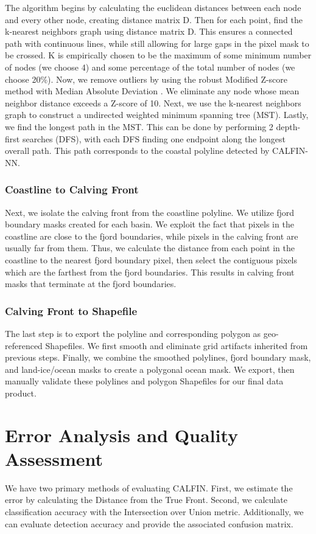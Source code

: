 \documentclass[tc, manuscript]{copernicus}
\begin{document}
The algorithm begins by calculating the euclidean distances between each node and every other node, creating distance matrix D. 
Then for each point, find the k-nearest neighbors graph using distance matrix D. This ensures a connected path with continuous lines, while still allowing for large gaps in the pixel mask to be crossed. K is empirically chosen to be the maximum of some minimum number of nodes (we choose 4) and some percentage of the total number of nodes (we choose 20\%). 
Now, we remove outliers by using the robust Modified Z-score method with Median Absolute Deviation \citep{garcia2012}. We eliminate any node whose mean neighbor distance exceeds a Z-score of 10. 
Next, we use the k-nearest neighbors graph to construct a undirected weighted minimum spanning tree (MST). Lastly, we find the longest path in the MST. This can be done by performing 2 depth-first searches (DFS), with each DFS finding one endpoint along the longest overall path. This path corresponds to the coastal polyline detected by CALFIN-NN.

\subsubsection{Coastline to Calving Front}
\label{sec:coastline}
Next, we isolate the calving front from the coastline polyline. We utilize fjord boundary masks created for each basin. We exploit the fact that pixels in the coastline are close to the fjord boundaries, while pixels in the calving front are usually far from them.
Thus, we calculate the distance from each point in the coastline to the nearest fjord boundary pixel, then select the contiguous pixels which are the farthest from the fjord boundaries. This results in calving front masks that terminate at the fjord boundaries.

\subsubsection{Calving Front to Shapefile}
\label{sec:shapefile}
The last step is to export the polyline and corresponding polygon as geo-referenced Shapefiles. We first smooth and eliminate grid artifacts inherited from previous steps. Finally, we combine the smoothed polylines, fjord boundary mask, and land-ice/ocean masks to create a polygonal ocean mask. We export, then manually validate these polylines and polygon Shapefiles for our final data product.

\section{Error Analysis and Quality Assessment}
\label{sec:error}
We have two primary methods of evaluating CALFIN. First, we estimate the error by calculating the Distance from the True Front. Second, we calculate classification accuracy with the Intersection over Union metric. Additionally, we can evaluate detection accuracy and provide the associated confusion matrix.
\end{document}
